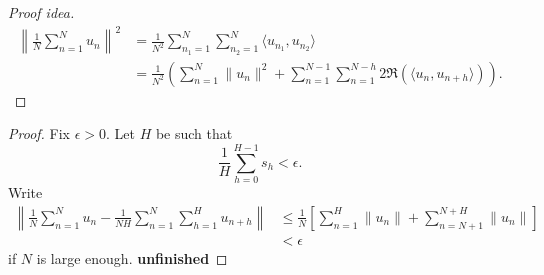 \documentclass{article}
\DeclareMathOperator*{\dlim}{D-lim}
\begin{document}
\color{gray}
\begin{proof}[Proof idea]
  \begin{align*}
    \left\lVert \frac{1}{N} \sum_{n=1}^N u_n \right\rVert^2 &= \frac{1}{N^2} \sum_{n_1=1}^N \sum_{n_2=1}^N \langle u_{n_1}, u_{n_2} \rangle \\
                                                            &= \frac{1}{N^2} \left(\sum_{n=1}^N \|u_n\|^2 + \sum_{n=1}^{N-1} \sum_{n=1}^{N-h} 2 \Re(\langle u_n, u_{n+h} \rangle)\right).
  \end{align*}
\end{proof}
\begin{proof}
  Fix $\epsilon > 0$. Let $H$ be such that
  \begin{equation*}
    \frac{1}{H} \sum_{h=0}^{H-1} s_h < \epsilon.
  \end{equation*}
  Write
  \begin{align*}
    \left\| \frac{1}{N} \sum_{n=1}^N u_n - \frac{1}{NH} \sum_{n=1}^N \sum_{h=1}^H u_{n+h} \right\| &\leq \frac{1}{N} \left[\sum_{n=1}^H \|u_n\| + \sum_{n=N+1}^{N+H} \|u_n\|\right] \\
                                                                                                   &< \epsilon
  \end{align*}
  if $N$ is large enough.
  \textbf{unfinished}
\end{proof}
\end{document}
